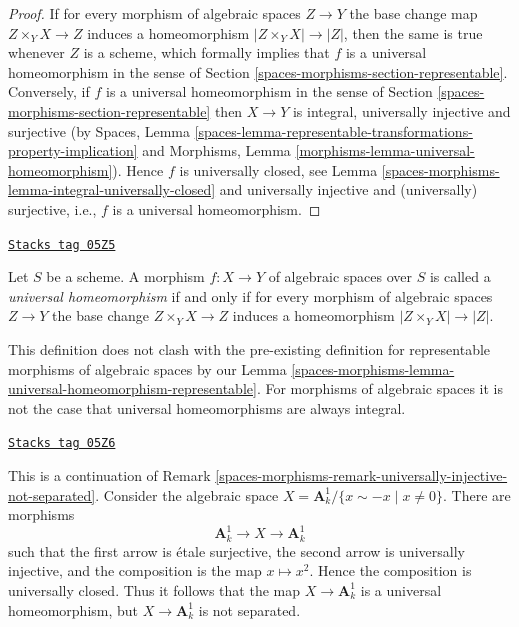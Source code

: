 \begin{proof}
If for every morphism of algebraic spaces $Z \to Y$ the base change
map $Z \times_Y X \to Z$ induces a homeomorphism
$|Z \times_Y X| \to |Z|$, then the same is true whenever $Z$ is a scheme,
which formally implies that $f$ is a universal homeomorphism in the
sense of
Section \ref{spaces-morphisms-section-representable}.
Conversely, if $f$ is a universal homeomorphism in the sense of
Section \ref{spaces-morphisms-section-representable}
then $X \to Y$ is integral, universally injective and surjective
(by Spaces, Lemma
\ref{spaces-lemma-representable-transformations-property-implication}
and
Morphisms, Lemma \ref{morphisms-lemma-universal-homeomorphism}).
Hence $f$ is universally closed, see
Lemma \ref{spaces-morphisms-lemma-integral-universally-closed}
and universally injective and (universally) surjective, i.e.,
$f$ is a universal homeomorphism.
\end{proof}

\begin{definition}
\label{spaces-morphisms-definition-universal-homeomorphism}
\href{https://stacks.math.columbia.edu/tag/05Z5}{\texttt{Stacks tag 05Z5}}

Let $S$ be a scheme.
A morphism $f : X \to Y$ of algebraic spaces over $S$
is called a {\it universal homeomorphism}
if and only if for every morphism of algebraic spaces $Z \to Y$
the base change $Z \times_Y X \to Z$ induces a homeomorphism
$|Z \times_Y X| \to |Z|$.
\end{definition}

This definition does not clash with the pre-existing definition for
representable morphisms of algebraic spaces by our
Lemma \ref{spaces-morphisms-lemma-universal-homeomorphism-representable}.
For morphisms of algebraic spaces it is not the case that universal
homeomorphisms are always integral.

\begin{example}
\label{spaces-morphisms-example-universal-homeomorphism}
\href{https://stacks.math.columbia.edu/tag/05Z6}{\texttt{Stacks tag 05Z6}}

This is a continuation of
Remark \ref{spaces-morphisms-remark-universally-injective-not-separated}.
Consider the algebraic space
$X = \mathbf{A}^1_k/\{x \sim -x \mid x \not = 0\}$.
There are morphisms
$$
\mathbf{A}^1_k \longrightarrow X \longrightarrow \mathbf{A}^1_k
$$
such that the first arrow is \'etale surjective, the second arrow is
universally injective, and the composition is the map $x \mapsto x^2$.
Hence the composition is universally closed. Thus it follows that the
map $X \to \mathbf{A}^1_k$ is a universal homeomorphism, but
$X \to \mathbf{A}^1_k$ is not separated.
\end{example}


